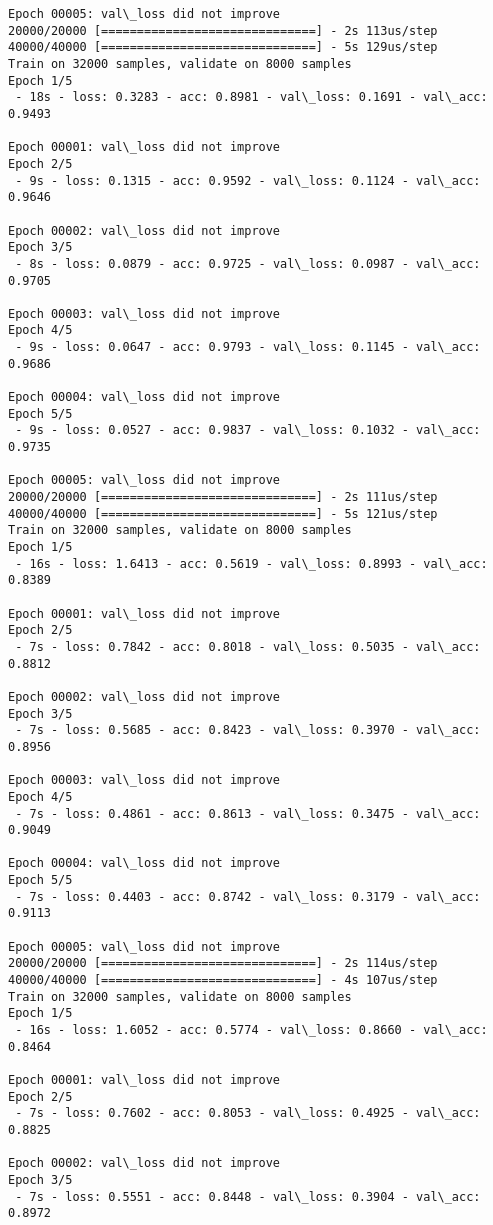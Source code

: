\documentclass[11pt]{article}
\begin{document}
\begin{Verbatim}[commandchars=\\\{\}]
Epoch 00005: val\_loss did not improve
20000/20000 [==============================] - 2s 113us/step
40000/40000 [==============================] - 5s 129us/step
Train on 32000 samples, validate on 8000 samples
Epoch 1/5
 - 18s - loss: 0.3283 - acc: 0.8981 - val\_loss: 0.1691 - val\_acc: 0.9493

Epoch 00001: val\_loss did not improve
Epoch 2/5
 - 9s - loss: 0.1315 - acc: 0.9592 - val\_loss: 0.1124 - val\_acc: 0.9646

Epoch 00002: val\_loss did not improve
Epoch 3/5
 - 8s - loss: 0.0879 - acc: 0.9725 - val\_loss: 0.0987 - val\_acc: 0.9705

Epoch 00003: val\_loss did not improve
Epoch 4/5
 - 9s - loss: 0.0647 - acc: 0.9793 - val\_loss: 0.1145 - val\_acc: 0.9686

Epoch 00004: val\_loss did not improve
Epoch 5/5
 - 9s - loss: 0.0527 - acc: 0.9837 - val\_loss: 0.1032 - val\_acc: 0.9735

Epoch 00005: val\_loss did not improve
20000/20000 [==============================] - 2s 111us/step
40000/40000 [==============================] - 5s 121us/step
Train on 32000 samples, validate on 8000 samples
Epoch 1/5
 - 16s - loss: 1.6413 - acc: 0.5619 - val\_loss: 0.8993 - val\_acc: 0.8389

Epoch 00001: val\_loss did not improve
Epoch 2/5
 - 7s - loss: 0.7842 - acc: 0.8018 - val\_loss: 0.5035 - val\_acc: 0.8812

Epoch 00002: val\_loss did not improve
Epoch 3/5
 - 7s - loss: 0.5685 - acc: 0.8423 - val\_loss: 0.3970 - val\_acc: 0.8956

Epoch 00003: val\_loss did not improve
Epoch 4/5
 - 7s - loss: 0.4861 - acc: 0.8613 - val\_loss: 0.3475 - val\_acc: 0.9049

Epoch 00004: val\_loss did not improve
Epoch 5/5
 - 7s - loss: 0.4403 - acc: 0.8742 - val\_loss: 0.3179 - val\_acc: 0.9113

Epoch 00005: val\_loss did not improve
20000/20000 [==============================] - 2s 114us/step
40000/40000 [==============================] - 4s 107us/step
Train on 32000 samples, validate on 8000 samples
Epoch 1/5
 - 16s - loss: 1.6052 - acc: 0.5774 - val\_loss: 0.8660 - val\_acc: 0.8464

Epoch 00001: val\_loss did not improve
Epoch 2/5
 - 7s - loss: 0.7602 - acc: 0.8053 - val\_loss: 0.4925 - val\_acc: 0.8825

Epoch 00002: val\_loss did not improve
Epoch 3/5
 - 7s - loss: 0.5551 - acc: 0.8448 - val\_loss: 0.3904 - val\_acc: 0.8972


\end{Verbatim}
\end{document}
